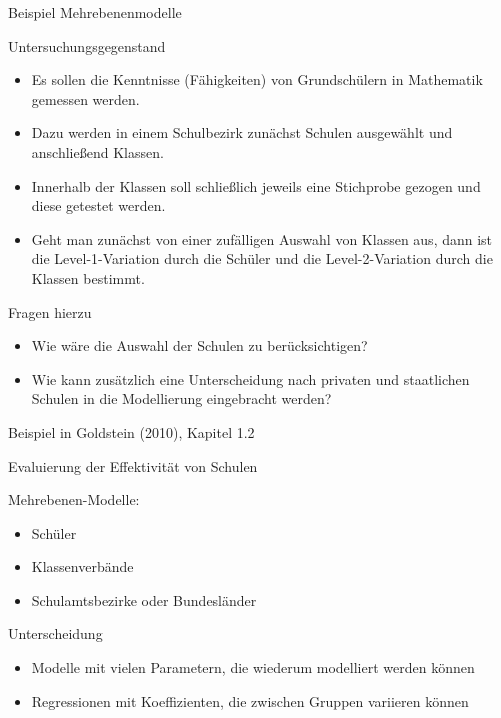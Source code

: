 \documentclass[ignorenonframetext,]{beamer}
\providecommand{\tightlist}{%
\setlength{\itemsep}{0pt}\setlength{\parskip}{0pt}}
\begin{document}
\begin{frame}{Beispiel Mehrebenenmodelle}

Untersuchungsgegenstand

\begin{itemize}
\item
  Es sollen die Kenntnisse (Fähigkeiten) von Grundschülern in Mathematik
  gemessen werden.
\item
  Dazu werden in einem Schulbezirk zunächst Schulen ausgewählt und
  anschließend Klassen.
\item
  Innerhalb der Klassen soll schließlich jeweils eine Stichprobe gezogen
  und diese getestet werden.
\item
  Geht man zunächst von einer zufälligen Auswahl von Klassen aus, dann
  ist die Level-1-Variation durch die Schüler und die Level-2-Variation
  durch die Klassen bestimmt.
\end{itemize}

\end{frame}

\begin{frame}{Fragen hierzu}

\begin{itemize}
\item
  Wie wäre die Auswahl der Schulen zu berücksichtigen?
\item
  Wie kann zusätzlich eine Unterscheidung nach privaten und staatlichen
  Schulen in die Modellierung eingebracht werden?
\end{itemize}

\end{frame}

\begin{frame}{Beispiel in Goldstein (2010), Kapitel 1.2}

Evaluierung der Effektivität von Schulen

Mehrebenen-Modelle:

\begin{itemize}
\tightlist
\item
  Schüler
\item
  Klassenverbände
\item
  Schulamtsbezirke oder Bundesländer
\end{itemize}

Unterscheidung

\begin{itemize}
\tightlist
\item
  Modelle mit vielen Parametern, die wiederum modelliert werden können
\item
  Regressionen mit Koeffizienten, die zwischen Gruppen variieren können
\end{itemize}

\end{frame}
\end{document}
